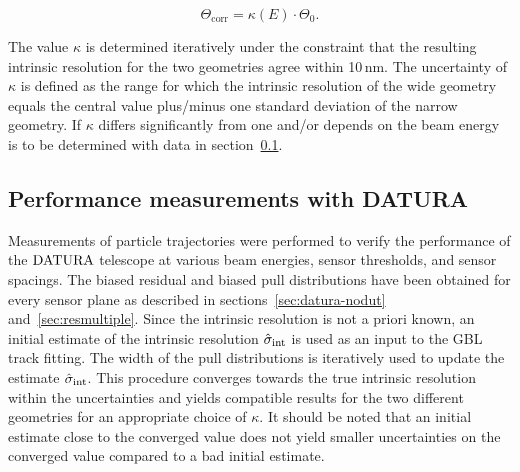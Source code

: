 \begin{equation}
 \Theta_{\textrm{corr}} = \kappa(E) \cdot \Theta_0.
 \label{eq:thetacorr}
\end{equation}

\noindent
The value $\kappa$ is determined iteratively under the constraint that the resulting intrinsic resolution for the two geometries agree within 10\,nm.
The uncertainty of $\kappa$ is defined as the range for which the intrinsic resolution of the wide geometry equals the central value plus/minus one standard deviation of the narrow geometry. 
If $\kappa$ differs significantly from one and/or depends on the beam energy is to be determined with data in section~\ref{sec:measurements}. 


\subsection{Performance measurements with DATURA}
\label{sec:measurements}

Measurements of particle trajectories were performed to verify the performance of the $\textrm{DATURA}$ telescope at various beam energies, sensor thresholds, and sensor spacings. %
The biased residual and biased pull distributions have been obtained for every sensor plane as described in sections~\ref{sec:datura-nodut} and~\ref{sec:resmultiple}. 
% 
Since the intrinsic resolution is not a priori known, an initial estimate of the intrinsic resolution $\hat{\sigma}_{\textrm{int}}$ is used as an input to the GBL track fitting. 
The width of the pull distributions is iteratively used to update the estimate $\hat{\sigma}_{\textrm{int}}$.
This procedure converges towards the true intrinsic resolution within the uncertainties and yields compatible results for the two different geometries for an appropriate choice of $\kappa$. 
It should be noted that an initial estimate close to the converged value does not yield smaller uncertainties on the converged value compared to a bad initial estimate.


